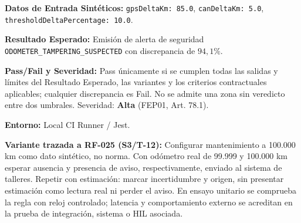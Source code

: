 \par\noindent\textbf{Datos de Entrada Sintéticos:} \texttt{g\allowbreak{}p\allowbreak{}s\allowbreak{}D\allowbreak{}e\allowbreak{}l\allowbreak{}t\allowbreak{}a\allowbreak{}K\allowbreak{}m\allowbreak{}:\allowbreak{} 8\allowbreak{}5\allowbreak{}.\allowbreak{}0\allowbreak{}}, \texttt{c\allowbreak{}a\allowbreak{}n\allowbreak{}D\allowbreak{}e\allowbreak{}l\allowbreak{}t\allowbreak{}a\allowbreak{}K\allowbreak{}m\allowbreak{}:\allowbreak{} 5\allowbreak{}.\allowbreak{}0\allowbreak{}}, \texttt{t\allowbreak{}h\allowbreak{}r\allowbreak{}e\allowbreak{}s\allowbreak{}h\allowbreak{}o\allowbreak{}l\allowbreak{}d\allowbreak{}D\allowbreak{}e\allowbreak{}l\allowbreak{}t\allowbreak{}a\allowbreak{}P\allowbreak{}e\allowbreak{}r\allowbreak{}c\allowbreak{}e\allowbreak{}n\allowbreak{}t\allowbreak{}a\allowbreak{}g\allowbreak{}e\allowbreak{}:\allowbreak{} 1\allowbreak{}0\allowbreak{}.\allowbreak{}0\allowbreak{}}.\par
\par\noindent\textbf{Resultado Esperado:} Emisión de alerta de seguridad \texttt{O\allowbreak{}D\allowbreak{}O\allowbreak{}M\allowbreak{}E\allowbreak{}T\allowbreak{}E\allowbreak{}R\allowbreak{}\_\allowbreak{}T\allowbreak{}A\allowbreak{}M\allowbreak{}P\allowbreak{}E\allowbreak{}R\allowbreak{}I\allowbreak{}N\allowbreak{}G\allowbreak{}\_\allowbreak{}S\allowbreak{}U\allowbreak{}S\allowbreak{}P\allowbreak{}E\allowbreak{}C\allowbreak{}T\allowbreak{}E\allowbreak{}D\allowbreak{}} con discrepancia de \(94{,}1\%\).\par
\par\noindent\textbf{Pass/Fail y Severidad:} Pass únicamente si se cumplen todas las salidas y límites del Resultado Esperado, las variantes y los criterios contractuales aplicables; cualquier discrepancia es Fail. No se admite una zona sin veredicto entre dos umbrales. Severidad: \textbf{Alta} (FEP01, Art. 78.1).\par
\par\noindent\textbf{Entorno:} Local CI Runner / Jest.\par







\par\noindent\textbf{Variante trazada a RF-025 (S3/T-12):} Configurar mantenimiento a 100.000 km como dato sintético, no norma. Con odómetro real de 99.999 y 100.000 km esperar ausencia y presencia de aviso, respectivamente, enviado al sistema de talleres. Repetir con estimación: marcar incertidumbre y origen, sin presentar estimación como lectura real ni perder el aviso. En ensayo unitario se comprueba la regla con reloj controlado; latencia y comportamiento externo se acreditan en la prueba de integración, sistema o HIL asociada.\par
